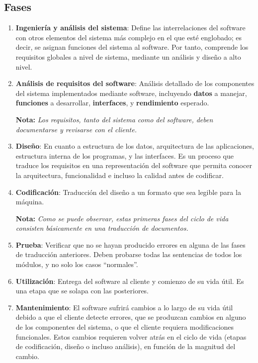 \subsection{Fases}
\begin{enumerate}

   \item \textbf{Ingeniería y análisis del sistema}: Define las interrelaciones del software con otros elementos del sistema más complejo en el que esté englobado; es decir, se asignan funciones del sistema al software. Por tanto, comprende los requisitos globales a nivel de sistema, mediante un análisis y diseño a alto nivel.

   \item \textbf{Análisis de requisitos del software}: Análisis detallado de los componentes del sistema implementados mediante software, incluyendo \textbf{datos} a manejar, \textbf{funciones} a desarrollar, \textbf{interfaces}, y \textbf{rendimiento} esperado.
   
   \textbf{Nota:} \textit{Los requisitos, tanto del sistema como del software, deben documentarse y revisarse con el cliente.}

   \item \textbf{Diseño}: En cuanto a estructura de los datos, arquitectura de las aplicaciones, estructura interna de los programas, y las interfaces. Es un proceso que traduce los requisitos en una representación del software que permita conocer la arquitectura, funcionalidad e incluso la calidad antes de codificar.

   \item \textbf{Codificación}: Traducción del diseño a un formato que sea legible para la máquina.
   
   \textbf{Nota:} \textit{Como se puede observar, estas primeras fases del ciclo de vida consisten básicamente en una traducción de documentos.}

   \item \textbf{Prueba}: Verificar que no se hayan producido errores en alguna de las fases de traducción anteriores. Deben probarse todas las sentencias de todos los módulos, y no solo los casos ``normales''.

   \item \textbf{Utilización}: Entrega del software al cliente y comienzo de su vida útil. Es una etapa que se solapa con las posteriores.
   
   \item \textbf{Mantenimiento}: El software sufrirá cambios a lo largo de su vida útil debido a que el cliente detecte errores, que se produzcan cambios en alguno de los componentes del sistema, o que el cliente requiera modificaciones funcionales. Estos cambios requieren volver atrás en el ciclo de vida (etapas de codificación, diseño o incluso análisis), en función de la magnitud del cambio.\\
   

\end{enumerate}
